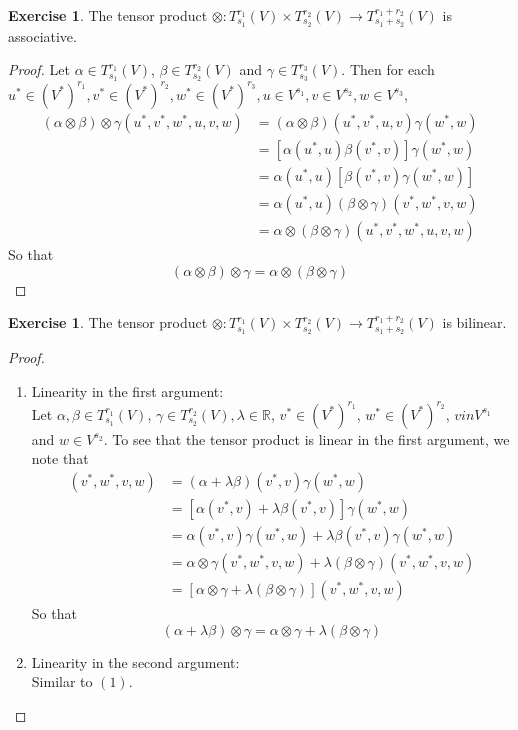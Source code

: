 \documentclass[12pt]{amsart}
\theoremstyle{definition}
\newtheorem{ex}[definition]{Exercise}
\newcommand{\al}{\alpha}
\newcommand{\gam}{\gamma}
\newcommand{\bet}{\beta}
\newcommand{\lam}{\lambda}
\newcommand{\R}{\mathbb{R}}
\newcommand{\Tn}[1]{T^{r_{#1}}_{s_{#1}}(V)}
\newcommand{\Tnp}{T^{r_1 + r_2}_{s_1 + s_2}(V)}
\begin{document}
	\begin{ex}
	The tensor product $\otimes : \Tn{1} \times  \Tn{2} \rightarrow \Tnp$ is associative. 
	\end{ex}
	
	\begin{proof}
	Let $\al \in \Tn{1}$, $\bet \in \Tn{2}$ and $\gam \in \Tn{3}$. Then for each $u^* \in (V^*)^{r_1}, v^* \in (V^*)^{r_2}, w^* \in (V^*)^{r_3}, u \in V^{s_1}, v \in V^{s_2}, w \in V^{s_3}$,  
	\begin{align*}
	(\al \otimes \bet) \otimes \gam (u^*, v^*, w^*, u, v, w) 
	&= (\al \otimes \bet) (u^*, v^*, u, v) \gam (w^*, w) \\
	&= [\al(u^*, u) \bet(v^*, v)] \gam(w^*, w) \\
	&= \al(u^*, u) [\bet(v^*, v) \gam(w^*, w)] \\
	&= \al(u^*, u) (\bet \otimes \gam) (v^*, w^*, v, w) \\
	&= \al \otimes (\bet \otimes \gam)(u^*, v^*, w^*, u, v, w) 
	\end{align*}
	So that $$(\al \otimes \bet) \otimes \gam = \al \otimes (\bet \otimes \gam)$$
\end{proof}		
	
	\begin{ex}
	The tensor product $\otimes : \Tn{1} \times  \Tn{2} \rightarrow \Tnp$ is bilinear. 
	\end{ex}
	
	\begin{proof}\
	\begin{enumerate}
	\item Linearity in the first argument:\\
	Let $\al, \bet \in \Tn{1}$, $ \gam \in \Tn{2}, \lam \in \R$, $v^* \in (V^*)^{r_1}$, $w^* \in (V^*)^{r_2}$, $v in V^{s_1}$ and $w \in V^{s_2}$. To see that the tensor product is linear in the first argument, we note that  
	\begin{align*}
	[(\al + \lam \bet) \otimes \gam] (v^*, w^*, v, w) 
	&= (\al + \lam \bet)(v^*, v) \gam(w^*, w) \\
	&= [\al(v^*, v) + \lam \bet (v^*, v)] \gam (w^*, w) \\
	&= \al(v^*, v) \gam (w^*, w) + \lam \bet (v^*, v) \gam (w^*, w) \\
	&= \al \otimes \gam (v^*, w^*, v, w)  + \lam (\bet \otimes \gam) (v^*, w^*, v, w) \\
	&= [\al \otimes \gam + \lam (\bet \otimes \gam)] (v^*, w^*, v, w) 
	\end{align*}
	So that $$(\al + \lam \bet) \otimes \gam = \al \otimes \gam + \lam (\bet \otimes \gam)$$
	\item Linearity in the second argument:\\
	Similar to $(1)$.
	\end{enumerate}
\end{proof}			
	
\end{document}
